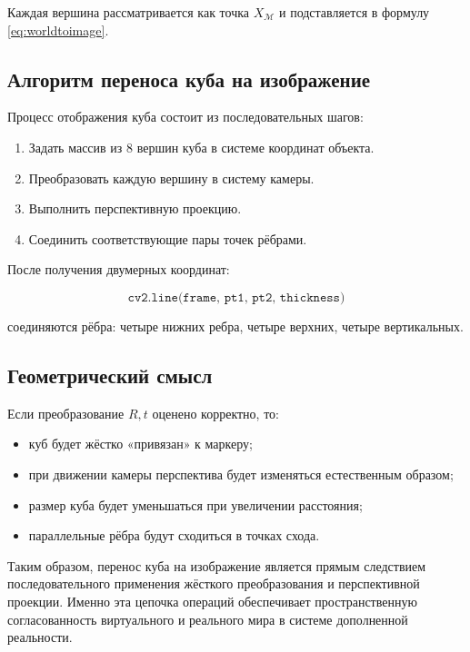 \documentclass[a4paper,12pt]{article}
\begin{document}
Каждая вершина рассматривается как точка $X_{\mathcal{M}}$ и подставляется в формулу \eqref{eq:worldtoimage}.

\subsection*{Алгоритм переноса куба на изображение}

Процесс отображения куба состоит из последовательных шагов:

\begin{enumerate}
    \item Задать массив из 8 вершин куба в системе координат объекта.
    \item Преобразовать каждую вершину в систему камеры.
    \item Выполнить перспективную проекцию.
    \item Соединить соответствующие пары точек рёбрами.
\end{enumerate}

После получения двумерных координат:

\begin{equation*}
\texttt{cv2.line(frame, pt1, pt2, thickness)}
\end{equation*}

соединяются рёбра: четыре нижних ребра, четыре верхних, четыре вертикальных.

\subsection*{Геометрический смысл}

Если преобразование $R,t$ оценено корректно, то:

\begin{itemize}
    \item куб будет жёстко «привязан» к маркеру;
    \item при движении камеры перспектива будет изменяться естественным образом;
    \item размер куба будет уменьшаться при увеличении расстояния;
    \item параллельные рёбра будут сходиться в точках схода.
\end{itemize}

Таким образом, перенос куба на изображение является прямым следствием последовательного применения жёсткого преобразования и перспективной проекции. Именно эта цепочка операций обеспечивает пространственную согласованность виртуального и реального мира в системе дополненной реальности.
 
\end{document}
